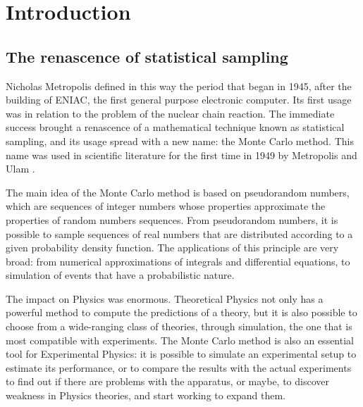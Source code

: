 {}
\begingroup
\let\clearpage\relax
\let\cleardoublepage\relax
\let\cleardoublepage\relax

\chapter*{Introduction}

\section*{The renascence of statistical sampling}
Nicholas Metropolis defined in this way \cite{metropolis:1987} the period that began in 1945, after the building of ENIAC, the first general purpose electronic computer.
Its first usage was in relation to the problem of the nuclear chain reaction.
The immediate success brought a renascence of a mathematical technique known as statistical sampling, and its usage spread with a new name: the Monte Carlo method.
This name was used in scientific literature for the first time in 1949 by Metropolis and Ulam \cite{metropolis-ulam:1949}.

The main idea of the Monte Carlo method is based on pseudorandom numbers, which are sequences of integer numbers whose properties approximate the properties of random numbers sequences.
From pseudorandom numbers, it is possible to sample sequences of real numbers that are distributed according to a given probability density function.
The applications of this principle are very broad: from numerical approximations of integrals and differential equations, to simulation of events that have a probabilistic nature.

The impact on Physics was enormous. Theoretical Physics not only has a powerful method to compute the predictions of a theory, but it is also possible to choose
from a wide-ranging class of theories, through simulation, the one that is most compatible with experiments.
The Monte Carlo method is also an essential tool for Experimental Physics: it is possible to simulate an experimental setup to estimate its performance, or to compare the results with the actual experiments to find out if there are problems with the apparatus, or maybe, to discover weakness in Physics theories, and start working to expand them.

